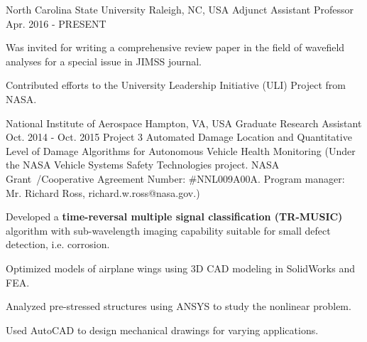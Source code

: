 \begin{cventries}
 \cventryprojtrued
    {North Carolina State University} %
    {Raleigh, NC, USA} %
    {Adjunct Assistant Professor} %
    {Apr. 2016 - PRESENT} %
    {     
     \begin{cvitems} %
       \item {Was invited for writing a comprehensive review paper in the field of wavefield analyses for a special issue in JIMSS journal.}
       \item {Contributed efforts to the University Leadership Initiative (ULI) Project from NASA.}
      \end{cvitems}
         }

  \cventryprojtrueb
    {National Institute of Aerospace} %
    {Hampton, VA, USA} %
    {Graduate Research Assistant} %
    {Oct. 2014 - Oct. 2015} %
    {Project 3} %
    {{Automated Damage Location and Quantitative Level of Damage Algorithms for Autonomous Vehicle Health Monitoring} (Under the NASA Vehicle Systems Safety Technologies project. NASA Grant\ /Cooperative Agreement Number: \#NNL009A00A. Program manager: Mr. Richard Ross, richard.w.ross@nasa.gov.)}
    {     
     \begin{cvitems} %
       \item {Developed a \textbf{time-reversal multiple signal classification (TR-MUSIC)} algorithm with sub-wavelength imaging capability suitable for small defect detection, i.e. corrosion. }
       \item {Optimized models of airplane wings using 3D CAD modeling in SolidWorks and FEA.}
       \item {Analyzed pre-stressed structures using ANSYS to study the nonlinear problem.}
       \item {Used AutoCAD to design mechanical drawings for varying applications.}
      \end{cvitems}
         }


\end{cventries}
